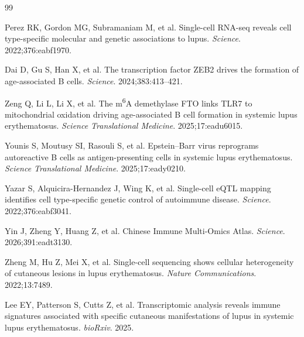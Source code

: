 \documentclass[12pt, a4paper]{article}
\begin{document}
\begin{thebibliography}{99}

Perez RK, Gordon MG, Subramaniam M, et al.
Single-cell RNA-seq reveals cell type-specific molecular and genetic associations to lupus.
\textit{Science}. 2022;376:eabf1970.

Dai D, Gu S, Han X, et al.
The transcription factor ZEB2 drives the formation of age-associated B cells.
\textit{Science}. 2024;383:413--421.

Zeng Q, Li L, Li X, et al.
The m\textsuperscript{6}A demethylase FTO links TLR7 to mitochondrial oxidation driving age-associated B cell formation in systemic lupus erythematosus.
\textit{Science Translational Medicine}. 2025;17:eadu6015.

Younis S, Moutusy SI, Rasouli S, et al.
Epstein--Barr virus reprograms autoreactive B cells as antigen-presenting cells in systemic lupus erythematosus.
\textit{Science Translational Medicine}. 2025;17:eady0210.

Yazar S, Alquicira-Hernandez J, Wing K, et al.
Single-cell eQTL mapping identifies cell type-specific genetic control of autoimmune disease.
\textit{Science}. 2022;376:eabf3041.

Yin J, Zheng Y, Huang Z, et al.
Chinese Immune Multi-Omics Atlas.
\textit{Science}. 2026;391:eadt3130.

Zheng M, Hu Z, Mei X, et al.
Single-cell sequencing shows cellular heterogeneity of cutaneous lesions in lupus erythematosus.
\textit{Nature Communications}. 2022;13:7489.

Lee EY, Patterson S, Cutts Z, et al.
Transcriptomic analysis reveals immune signatures associated with specific cutaneous manifestations of lupus in systemic lupus erythematosus.
\textit{bioRxiv}. 2025.

\end{thebibliography}
\end{document}

